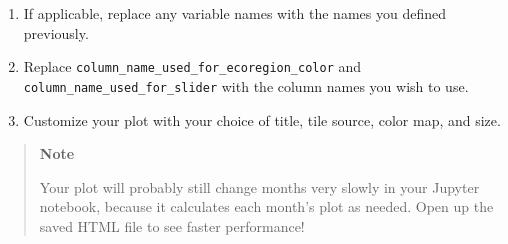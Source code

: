\documentclass[
  letterpaper,
  DIV=11,
  numbers=noendperiod,
  oneside]{scrreprt}
\providecommand{\tightlist}{%
  \setlength{\itemsep}{0pt}\setlength{\parskip}{0pt}}
\begin{document}
\begin{tcolorbox}[enhanced jigsaw, colbacktitle=quarto-callout-color!10!white, opacityback=0, bottomtitle=1mm, toptitle=1mm, bottomrule=.15mm, left=2mm, colframe=quarto-callout-color-frame, leftrule=.75mm, opacitybacktitle=0.6, colback=white, rightrule=.15mm, toprule=.15mm, breakable, titlerule=0mm, title=\textcolor{quarto-callout-color}{\faInfo}\hspace{0.5em}{Try It: Map migration over time}, coltitle=black, arc=.35mm]

\begin{enumerate}
\def\labelenumi{\arabic{enumi}.}
\tightlist
\item
  If applicable, replace any variable names with the names you defined
  previously.
\item
  Replace \texttt{column\_name\_used\_for\_ecoregion\_color} and
  \texttt{column\_name\_used\_for\_slider} with the column names you
  wish to use.
\item
  Customize your plot with your choice of title, tile source, color map,
  and size.
\end{enumerate}

\begin{quote}
\textbf{Note}

Your plot will probably still change months very slowly in your Jupyter
notebook, because it calculates each month's plot as needed. Open up the
saved HTML file to see faster performance!
\end{quote}

\end{tcolorbox}
\end{document}
